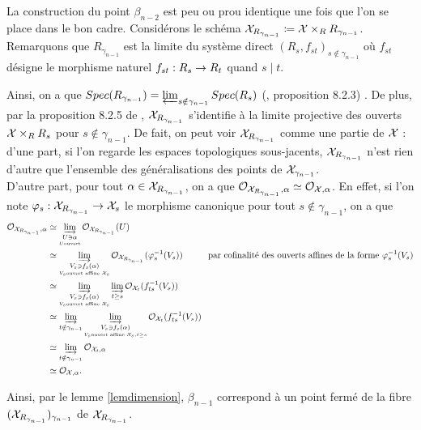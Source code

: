 \documentclass[11pt]{article}
\begin{document}
La construction du point $\beta_{n-2}$ est peu ou prou identique une fois que l'on se place dans le bon cadre. Considérons le schéma  $\CX_{R_{\gamma_{n-1}}} \coloneqq \CX \times_R R_{\gamma_{n-1}}$. Remarquons que $R_{\gamma_{n-1}}$ est la limite du système direct $(R_s,f_{st})_{s \notin \gamma_{n-1}}$ où $f_{st}$ désigne le morphisme naturel $f_{st} : R_s \rightarrow R_t$ quand $s \mid t$.

Ainsi, on a que $Spec(R_{\gamma_{n-1}}) = \varprojlim_{s \notin \gamma_{n-1}} Spec(R_s)$ (\cite{PMIHES_1966__28__5_0}, proposition 8.2.3) . De plus, par la proposition 8.2.5 de \cite{PMIHES_1966__28__5_0}, $\mathcal{X}_{R_{\gamma_{n-1}}}$ s'identifie à la limite projective des ouverts $\mathcal{X} \times_R R_s$ pour $s \notin \gamma_{n-1}$. De fait, on peut voir $\mathcal{X}_{R_{\gamma_{n-1}}}$ comme une partie de $\mathcal{X}$ : d'une part, si l'on regarde les espaces topologiques sous-jacents, $\mathcal{X}_{R_{\gamma_{n-1}}}$ n'est rien d'autre que l'ensemble des généralisations des points de $\mathcal{X}_{\gamma_{n-1}}$.\\
D'autre part, pour tout $\alpha \in \mathcal{X}_{R_{\gamma_{n-1}}}$, on a que $\mathcal{O}_{\mathcal{X}_{R_{\gamma_{n-1}}}, \alpha} \simeq \mathcal{O}_{\mathcal{X}, \alpha}$.
En effet, si l'on note $\varphi_s : \mathcal{X}_{R_{\gamma_{n-1}}} \rightarrow \mathcal{X}_s$ le morphisme canonique pour tout $s \notin \gamma_{n-1}$, on a que
\begin{align*}
\mathcal{O}_{\mathcal{X}_{R_{\gamma_{n-1}}}, \alpha} & \simeq \varinjlim_{\underset{U \text{ouvert}}{U \ni \alpha}} \mathcal{O}_{\mathcal{X}_{R_{\gamma_{n-1}}}}(U) \\
& \simeq \varinjlim_{{\underset{V_s \text{ouvert affine } \mathcal{X}_s}{V_s \ni f_s(\alpha)}}} \mathcal{O}_{\mathcal{X}_{R_{\gamma_{n-1}}}}(\varphi^{-1}_s(V_s)) \hspace{1cm} \text{par cofinalité des ouverts affines de la forme $\varphi^{-1}_s(V_s)$} \\
& \simeq \varinjlim_{\underset{V_s \text{ouvert affine } \mathcal{X}_s}{V_s \ni f_s(\alpha)}} \varinjlim_{t \geq s} \mathcal{O}_{\mathcal{X}_t}(f_{ts}^{-1}(V_s)) \\
& \simeq \varinjlim_{t \notin \gamma_{n-1}} \varinjlim_{\underset{V_s \text{ouvert affine } \mathcal{X}_s, t \geq s}{V_s \ni f_s(\alpha)}} \mathcal{O}_{\mathcal{X}_t}(f_{ts}^{-1}(V_s)) \\
& \simeq \varinjlim_{t \notin \gamma_{n-1}} \mathcal{O}_{\mathcal{X}_t, \alpha} \\
& \simeq \mathcal{O}_{\mathcal{X}, \alpha}.
\end{align*}

Ainsi, par le lemme \ref{lemdimension}, $\beta_{n-1}$ correspond à un point fermé de la fibre $(\mathcal{X}_{R_{\gamma_{n-1}}})_{\gamma_{n-1}}$ de $\mathcal{X}_{R_{\gamma_{n-1}}}$.\\
\end{document}
